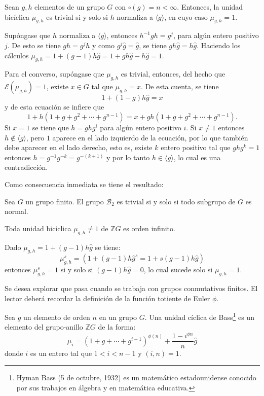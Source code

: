 \begin{proposicion}\label{prop:unidadesb}
Sean $g,h$ elementos de un grupo $G$ con $\circ(g) = n < \infty$. Entonces, la unidad bicíclica $\mu_{g,h}$ es trivial si y solo si $h$ normaliza a $\langle g \rangle$, en cuyo caso $\mu_{g,h} = 1$.
\end{proposicion}
\begin{proof*}
Supóngase que $h$ normaliza a $\langle g \rangle$, entonces $h^{-1}gh = g^j$, para algún entero positivo $j$. De esto se tiene $gh = g^jh$ y como $g^j\hat{g} = \hat{g}$, se tiene $gh\hat{g} = h\hat{g}$. Haciendo los cálculos $\mu_{g,h} = 1+(g-1)h\hat{g}= 1+gh\hat{g}-h\hat{g} =1$.

Para el converso, supóngase que $\mu_{g,h}$ es trivial, entonces, del hecho que $\mathcal{E}(\mu_{g,h})=1$, existe $x \in G$ tal que $\mu_{g,h}=x$. De esta cuenta, se tiene
\[ 1+(1-g)h\hat{g} = x \] y de esta ecuación se infiere que \[ 1+ h(1+g+g^2+\cdots + g^{n-1}) = x +gh(1+g+g^2+\cdots+g^{n-1}).  \] 
\indent Si $x=1$ se tiene que $h=ghg^i$ para algún entero positivo $i$. Si $x \neq 1$ entonces $h \notin \langle g \rangle$, pero $1$ aparece en el lado izquierdo de la ecuación, por lo que también debe aparecer en el lado derecho, esto es, existe $k$ entero positivo tal que $ghg^k = 1$ entonces $h = g^{-1}g^{-k}= g^{-(k+1)}$ y por lo tanto $h \in \langle g \rangle$, lo cual es una contradicción. 
\end{proof*}
Como consecuencia inmediata se tiene el resultado:
\begin{proposicion}
Sea $G$ un grupo finito. El grupo $\mathcal{B}_2$ es trivial si y solo si todo subgrupo de $G$ es normal.
\end{proposicion}
\begin{proposicion}
Toda unidad bicíclica $\mu_{g,h} \neq 1$ de $\mathds{Z}G$ es orden infinito. 
\end{proposicion}
\begin{proof*}
Dado $\mu_{g,h} = 1 +(g-1)h\hat{g}$ se tiene:
\[  \mu_{g,h}^s = (1+(g-1)h\hat{g}^s = 1+s(g-1)h\hat{g})  \] entonces $\mu_{g,h}^s = 1$ si y solo si $(g-1)h\hat{g} = 0$, lo cual sucede solo si $\mu_{g,h} = 1$.
\end{proof*}
Se desea explorar que pasa cuando se trabaja con grupos conmutativos finitos. El lector deberá recordar la definición de la función totiente de Euler $\phi$. 
\begin{definicion}
Sea $g$ un elemento de orden $n$ en un grupo $G$. Una unidad cíclica \nopagebreak[0] de Bass\footnote{Hyman Bass (5 de octubre, 1932) es un matemático estadounidense conocido por sus trabajos en álgebra y en matemática educativa.  } es un elemento del grupo-anillo $\mathds{Z}G$ de la forma:
\[ \mu_{i} = (1+g+\cdots+g^{i-1})^{\phi(n)} + \frac{1-i^{\phi{n}}}{n}\hat{g}  \] donde $i$ es un entero tal que $1<i<n-1$ y $(i,n) = 1$.
\end{definicion}
